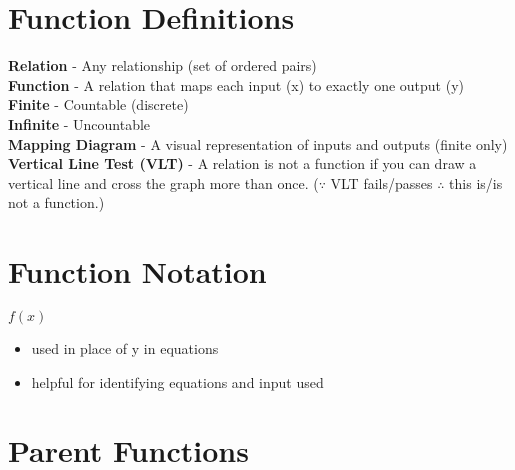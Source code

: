 \documentclass{article}
\begin{document}

\section{Function Definitions}

\textbf{Relation} - Any relationship (set of ordered pairs) \\
\textbf{Function} - A relation that maps each input (x) to exactly one output (y)\\
\textbf{Finite} - Countable (discrete)\\
\textbf{Infinite} - Uncountable \\
\textbf{Mapping Diagram} - A visual representation of inputs and outputs (finite only)\\
\textbf{Vertical Line Test (VLT)} - A relation is not a function if you can draw a vertical line and cross the graph more than once. ($\because$ VLT fails/passes $\therefore$ this is/is not a function.)\\

\section{Function Notation}

\textbf{$f(x)$}
\begin{itemize}
    \item used in place of y in equations
    \item helpful for identifying equations and input used
\end{itemize}



\newpage
\section{Parent Functions}
\end{document}

